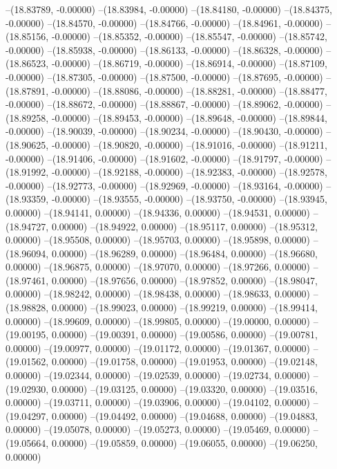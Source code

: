 --(18.83789, -0.00000)
--(18.83984, -0.00000)
--(18.84180, -0.00000)
--(18.84375, -0.00000)
--(18.84570, -0.00000)
--(18.84766, -0.00000)
--(18.84961, -0.00000)
--(18.85156, -0.00000)
--(18.85352, -0.00000)
--(18.85547, -0.00000)
--(18.85742, -0.00000)
--(18.85938, -0.00000)
--(18.86133, -0.00000)
--(18.86328, -0.00000)
--(18.86523, -0.00000)
--(18.86719, -0.00000)
--(18.86914, -0.00000)
--(18.87109, -0.00000)
--(18.87305, -0.00000)
--(18.87500, -0.00000)
--(18.87695, -0.00000)
--(18.87891, -0.00000)
--(18.88086, -0.00000)
--(18.88281, -0.00000)
--(18.88477, -0.00000)
--(18.88672, -0.00000)
--(18.88867, -0.00000)
--(18.89062, -0.00000)
--(18.89258, -0.00000)
--(18.89453, -0.00000)
--(18.89648, -0.00000)
--(18.89844, -0.00000)
--(18.90039, -0.00000)
--(18.90234, -0.00000)
--(18.90430, -0.00000)
--(18.90625, -0.00000)
--(18.90820, -0.00000)
--(18.91016, -0.00000)
--(18.91211, -0.00000)
--(18.91406, -0.00000)
--(18.91602, -0.00000)
--(18.91797, -0.00000)
--(18.91992, -0.00000)
--(18.92188, -0.00000)
--(18.92383, -0.00000)
--(18.92578, -0.00000)
--(18.92773, -0.00000)
--(18.92969, -0.00000)
--(18.93164, -0.00000)
--(18.93359, -0.00000)
--(18.93555, -0.00000)
--(18.93750, -0.00000)
--(18.93945, 0.00000)
--(18.94141, 0.00000)
--(18.94336, 0.00000)
--(18.94531, 0.00000)
--(18.94727, 0.00000)
--(18.94922, 0.00000)
--(18.95117, 0.00000)
--(18.95312, 0.00000)
--(18.95508, 0.00000)
--(18.95703, 0.00000)
--(18.95898, 0.00000)
--(18.96094, 0.00000)
--(18.96289, 0.00000)
--(18.96484, 0.00000)
--(18.96680, 0.00000)
--(18.96875, 0.00000)
--(18.97070, 0.00000)
--(18.97266, 0.00000)
--(18.97461, 0.00000)
--(18.97656, 0.00000)
--(18.97852, 0.00000)
--(18.98047, 0.00000)
--(18.98242, 0.00000)
--(18.98438, 0.00000)
--(18.98633, 0.00000)
--(18.98828, 0.00000)
--(18.99023, 0.00000)
--(18.99219, 0.00000)
--(18.99414, 0.00000)
--(18.99609, 0.00000)
--(18.99805, 0.00000)
--(19.00000, 0.00000)
--(19.00195, 0.00000)
--(19.00391, 0.00000)
--(19.00586, 0.00000)
--(19.00781, 0.00000)
--(19.00977, 0.00000)
--(19.01172, 0.00000)
--(19.01367, 0.00000)
--(19.01562, 0.00000)
--(19.01758, 0.00000)
--(19.01953, 0.00000)
--(19.02148, 0.00000)
--(19.02344, 0.00000)
--(19.02539, 0.00000)
--(19.02734, 0.00000)
--(19.02930, 0.00000)
--(19.03125, 0.00000)
--(19.03320, 0.00000)
--(19.03516, 0.00000)
--(19.03711, 0.00000)
--(19.03906, 0.00000)
--(19.04102, 0.00000)
--(19.04297, 0.00000)
--(19.04492, 0.00000)
--(19.04688, 0.00000)
--(19.04883, 0.00000)
--(19.05078, 0.00000)
--(19.05273, 0.00000)
--(19.05469, 0.00000)
--(19.05664, 0.00000)
--(19.05859, 0.00000)
--(19.06055, 0.00000)
--(19.06250, 0.00000)
